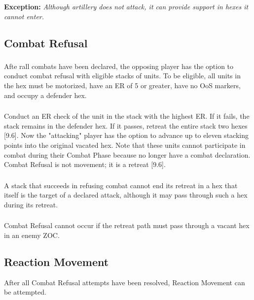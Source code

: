 \textbf{Exception:} \textit{Although artillery does not attack, it can provide support in hexes it cannot enter.}

\subsection{Combat Refusal}
\subsubsection{}
Afte rall combats have been declared, the opposing player has the option to conduct combat refusal with eligible stacks of units. To be eligible, all units in the hex must be motorized, have an ER of 5 or greater, have no OoS markers, and occupy a defender hex.

\subsubsection{}
Conduct an ER check of the unit in the stack with the highest ER. If it fails, the stack remains in the defender hex. If it passes, retreat the entire stack two hexes [9.6]. Now the "attacking" player has the option to advance up to eleven stacking points into the original vacated hex. Note that these units cannot participate in combat during their Combat Phase because no longer have a combat declaration. Combat Refusal is not movement; it is a retreat [9.6].

\subsubsection{}
A stack that succeeds in refusing combat cannot end its retreat in a hex that itself is the target of a declared attack, although it may pass through such a hex during its retreat.

\subsubsection{}
Combat Refusal cannot occur if the retreat path must pass through a vacant hex in an enemy ZOC.

\subsection{Reaction Movement}
After all Combat Refusal attempts have been resolved, Reaction Movement can be attempted.

